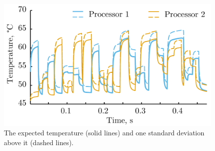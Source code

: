 \begin{figure}[tr]
  \vspace{-1.0em}
  \centering
  \includegraphics[width=0.80\columnwidth]{include/assets/temperature.pdf}
  \caption{The expected temperature (solid lines) and one standard deviation above it (dashed lines).}
  \vspace{-1.5em}
\end{figure}
